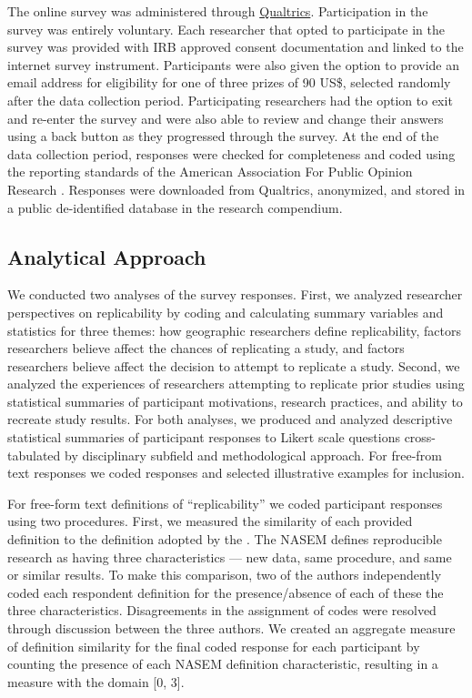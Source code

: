 \documentclass[]{interact}
\theoremstyle{plain}%
\theoremstyle{definition}
\theoremstyle{remark}
\begin{document}
The online survey was administered through \href{https://www.qualtrics.com/}{Qualtrics}. 
Participation in the survey was entirely voluntary. 
Each researcher that opted to participate in the survey was provided with IRB approved consent documentation and linked to the internet survey instrument. 
Participants were also given the option to provide an email address for eligibility for one of three  prizes of 90 US\$, selected randomly after the data collection period.
Participating researchers had the option to exit and re-enter the survey and were also able to review and change their answers using a back button as they progressed through the survey.
At the end of the data collection period, responses were checked for completeness and coded using the reporting standards of the American Association For Public Opinion Research \citep{aaporstandards}.
Responses were downloaded from Qualtrics, anonymized, and stored in a public de-identified database in the research compendium.

\subsection*{Analytical Approach}

We conducted two analyses of the survey responses.
First, we analyzed researcher perspectives on replicability by coding and calculating summary variables and statistics for three themes: how geographic researchers define replicability, factors researchers believe affect the chances of replicating a study, and factors researchers believe affect the decision to attempt to replicate a study.
Second, we analyzed the experiences of researchers attempting to replicate prior studies using statistical summaries of participant motivations, research practices, and ability to recreate study results.
For both analyses, we produced and analyzed descriptive statistical summaries of participant responses to Likert scale questions cross-tabulated by disciplinary subfield and methodological approach.
For free-from text responses we coded responses and selected illustrative examples for inclusion. 

For free-form text definitions of ``replicability'' we coded participant responses using two procedures. 
First, we measured the similarity of each provided definition to the definition adopted by the \citet{NASEM2019}. 
The NASEM defines reproducible research as having three characteristics --- new data, same procedure, and same or similar results.
To make this comparison, two of the authors independently coded each respondent definition for the presence/absence of each of these the three characteristics.
Disagreements in the assignment of codes were resolved through discussion between the three authors.
We created an aggregate measure of definition similarity for the final coded response for each participant by counting the presence of each NASEM definition characteristic, resulting in a measure with the domain [0, 3].
\end{document}

